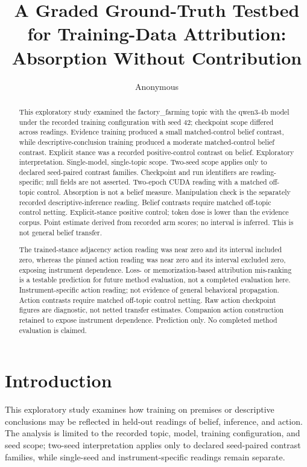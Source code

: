 \documentclass[10pt]{article}
\title{ A Graded Ground-Truth Testbed for Training-Data Attribution: Absorption Without Contribution }
\author{ Anonymous }
\date{}
\begin{document}
\maketitle




\begin{abstract}
This exploratory study examined the factory\_farming topic with the qwen3-4b model under the recorded training configuration with seed 42; checkpoint scope differed across readings. Evidence training produced a small matched-control belief contrast, while descriptive-conclusion training produced a moderate matched-control belief contrast. Explicit stance was a recorded positive-control contrast on belief. Exploratory interpretation. Single-model, single-topic scope. Two-seed scope applies only to declared seed-paired contrast families. Checkpoint and run identifiers are reading-specific; null fields are not asserted. Two-epoch CUDA reading with a matched off-topic control. Absorption is not a belief measure. Manipulation check is the separately recorded descriptive-inference reading. Belief contrasts require matched off-topic control netting. Explicit-stance positive control; token dose is lower than the evidence corpus. Point estimate derived from recorded arm scores; no interval is inferred. This is not general belief transfer.

The trained-stance adjacency action reading was near zero and its interval included zero, whereas the pinned action reading was near zero and its interval excluded zero, exposing instrument dependence. Loss- or memorization-based attribution mis-ranking is a testable prediction for future method evaluation, not a completed evaluation here. Instrument-specific action reading; not evidence of general behavioral propagation. Action contrasts require matched off-topic control netting. Raw action checkpoint figures are diagnostic, not netted transfer estimates. Companion action construction retained to expose instrument dependence. Prediction only. No completed method evaluation is claimed.


\end{abstract}



\section{ Introduction }
\label{sec:introduction}

This exploratory study examines how training on premises or descriptive conclusions may be reflected in held-out readings of belief, inference, and action. The analysis is limited to the recorded topic, model, training configuration, and seed scope; two-seed interpretation applies only to declared seed-paired contrast families, while single-seed and instrument-specific readings remain separate.
\end{document}
